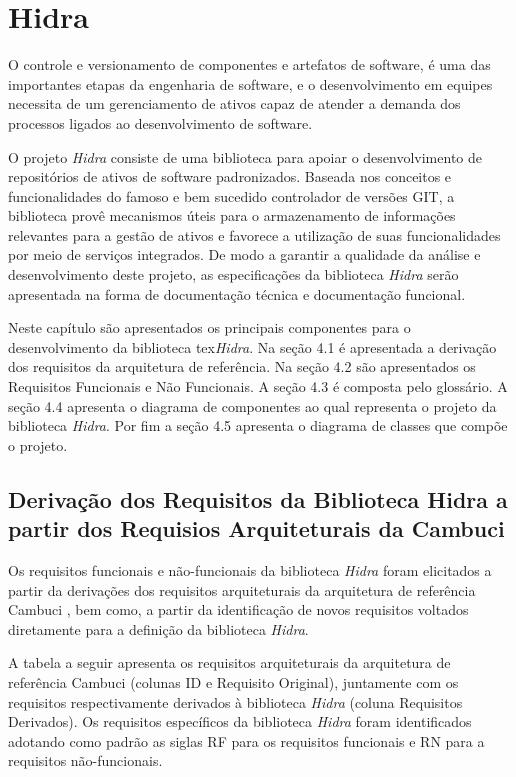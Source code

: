 \chapter{Hidra} \label{chapter:hidra}

O controle e versionamento de componentes e artefatos de software, é uma das importantes etapas da engenharia de software, e o desenvolvimento em equipes necessita de um gerenciamento de ativos capaz de atender a demanda dos processos ligados ao desenvolvimento de software.

O projeto \textit{Hidra} consiste de uma biblioteca para apoiar o desenvolvimento de repositórios de ativos de software padronizados. Baseada nos conceitos e funcionalidades do famoso e bem sucedido controlador de versões GIT, a biblioteca provê mecanismos úteis para o armazenamento de informações relevantes para a gestão de ativos e favorece a utilização de suas funcionalidades por meio de serviços integrados. De modo a garantir a qualidade da análise e desenvolvimento deste projeto, as especificações da biblioteca \textit{Hidra} serão apresentada na forma de documentação técnica e documentação funcional.

Neste capítulo são apresentados os principais componentes para o desenvolvimento da biblioteca tex\textit{Hidra}. Na seção 4.1 é apresentada a derivação dos requisitos da arquitetura de referência. Na seção 4.2 são apresentados os Requisitos Funcionais e Não Funcionais. A seção 4.3 é composta pelo glossário. A seção 4.4 apresenta o diagrama de componentes ao qual representa o projeto da biblioteca \textit{Hidra}. Por fim a seção 4.5 apresenta o diagrama de classes que compõe o projeto.

\section{Derivação dos Requisitos da Biblioteca Hidra a partir dos Requisios Arquiteturais da Cambuci}


Os requisitos funcionais e não-funcionais da biblioteca \textit{Hidra} foram elicitados a partir da derivações dos requisitos arquiteturais da arquitetura de referência Cambuci \cite{dissertacaoOsshiro2014}, bem como, a partir da identificação de novos requisitos voltados diretamente para a definição da biblioteca \textit{Hidra}.

A tabela a seguir apresenta os requisitos arquiteturais da arquitetura de referência Cambuci (colunas ID e Requisito Original), juntamente com os requisitos respectivamente derivados à biblioteca \textit{Hidra} (coluna Requisitos Derivados). Os requisitos específicos da biblioteca \textit{Hidra} foram identificados adotando como padrão as siglas RF para os requisitos funcionais e RN para a requisitos não-funcionais.

\newpage





%



